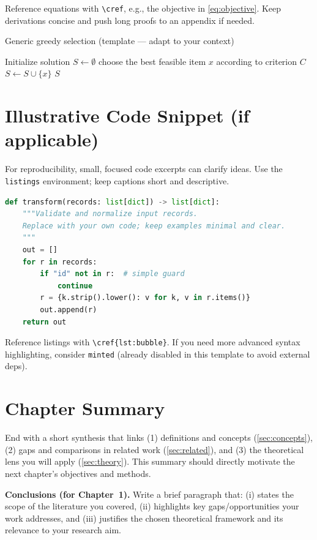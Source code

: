 Reference equations with \verb|\cref|, e.g., the objective in \cref{eq:objective}. Keep derivations concise and push long proofs to an appendix if needed.

\begin{algorithm}[h]
\caption{Generic greedy selection (template — adapt to your context)}
\begin{algorithmic}[1]
  \State Initialize solution $S \gets \emptyset$
    \State choose the best feasible item $x$ according to criterion $C$
    \State $S \gets S \cup \{x\}$
  \EndWhile
  \State \Return $S$
\end{algorithmic}
\label{alg:example}
\end{algorithm}

\section{Illustrative Code Snippet (if applicable)}
\label{sec:listings}
For reproducibility, small, focused code excerpts can clarify ideas. Use the \texttt{listings} environment; keep captions short and descriptive.

\begin{lstlisting}[language=Python,caption={Example function signature for data transform},label={lst:bubble},float=htbp]
def transform(records: list[dict]) -> list[dict]:
    """Validate and normalize input records.
    Replace with your own code; keep examples minimal and clear.
    """
    out = []
    for r in records:
        if "id" not in r:  # simple guard
            continue
        r = {k.strip().lower(): v for k, v in r.items()}
        out.append(r)
    return out
\end{lstlisting}

Reference listings with \verb|\cref{lst:bubble}|. If you need more advanced syntax highlighting, consider \texttt{minted} (already disabled in this template to avoid external deps).

\section{Chapter Summary}
\label{sec:summary}
End with a short synthesis that links
(1) definitions and concepts (\cref{sec:concepts}),
(2) gaps and comparisons in related work (\cref{sec:related}),
and (3) the theoretical lens you will apply (\cref{sec:theory}).
This summary should directly motivate the next chapter’s objectives and methods.

\noindent\textbf{Conclusions (for Chapter~1).}
Write a brief paragraph that: (i) states the scope of the literature you covered, (ii) highlights key gaps/opportunities your work addresses, and (iii) justifies the chosen theoretical framework and its relevance to your research aim.
